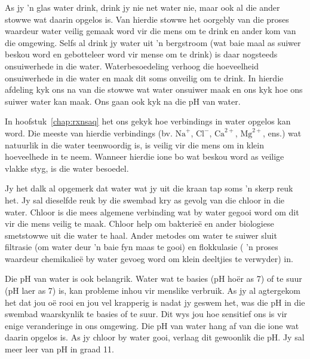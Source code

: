 As jy  'n glas water drink, drink jy nie net water nie, maar ook al die ander stowwe wat daarin opgelos is. Van hierdie stowwe het oorgebly van die proses waardeur water veilig gemaak word vir die mens om te drink en ander kom van die omgewing. Selfs al drink jy water uit  'n bergstroom (wat baie maal as suiwer beskou word en gebotteleer word vir mense om te drink) is daar nogsteeds onsuiwerhede in die water. Waterbesoedeling verhoog die hoeveelheid onsuiwerhede in die water en maak dit soms onveilig om te drink. In hierdie afdeling kyk ons na van die stowwe wat water onsuiwer maak en ons kyk hoe ons suiwer water kan maak. Ons gaan ook kyk na die pH van water.
\par 
\label{m38138*id08324}
In hoofstuk~\ref{chap:rxnsaq} het ons gekyk hoe verbindings in water opgelos kan word. Die meeste van hierdie verbindings (bv. ${\text{Na}}^{+}$, ${\text{Cl}}^{-}$, ${\text{Ca}}^{2+}$, ${\text{Mg}}^{2+}$, ens.) wat natuurlik in die water teenwoordig is, is veilig vir die mens om in klein hoeveelhede in te neem. Wanneer hierdie ione bo wat beskou word as veilige vlakke styg, is die water besoedel.
\par 
\label{m38138*id08322346}Jy het dalk al opgemerk dat water wat jy uit die kraan tap soms  'n skerp reuk het. Jy sal dieselfde reuk by die swembad kry as gevolg van die chloor in die water. Chloor is die mees algemene verbinding wat by water gegooi word om dit vir die mens veilig te maak. Chloor help om bakterie\"{e} en ander biologiese smetstowwe uit die water te haal. Ander metodes om water te suiwer sluit filtrasie (om water deur  'n baie fyn maas te gooi) en flokkulasie ( 'n proses waardeur chemikalieë by water gevoeg word om klein deeltjies te verwyder) in.  
\par 
\label{m38138*id0832}
Die pH van water is ook belangrik. Water wat te basies (pH hoër as 7) of te suur (pH laer as 7) is, kan probleme inhou vir menslike verbruik. As jy al agtergekom het dat jou oë rooi en jou vel krapperig is nadat jy geswem het, was die pH in die swembad waarskynlik te basies of te suur. Dit wys jou hoe sensitief ons is vir enige veranderinge in ons omgewing. Die pH van water hang af van die ione wat daarin opgelos is. As jy chloor by water gooi, verlaag dit gewoonlik die pH. Jy sal meer leer van pH in graad 11.
\label{m38138*id08321}
